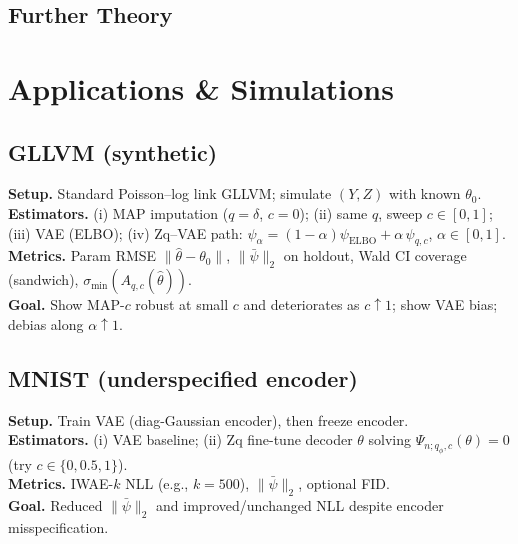 \documentclass[twoside,11pt]{article}
\begin{document}
\subsection{Further Theory}



\section{Applications \& Simulations}\label{sec:apps}

\subsection{GLLVM (synthetic)}
\textbf{Setup.} Standard Poisson–log link GLLVM; simulate $(Y,Z)$ with known $\theta_0$. \\
\textbf{Estimators.} (i) MAP imputation ($q=\delta$, $c=0$); (ii) same $q$, sweep $c\in[0,1]$; (iii) VAE (ELBO); (iv) Zq–VAE path: $\psi_\alpha=(1-\alpha)\psi_{\text{ELBO}}+\alpha\,\psi_{q,c}$, $\alpha\in[0,1]$. \\
\textbf{Metrics.} Param RMSE $\|\hat\theta-\theta_0\|$, $\|\bar\psi\|_2$ on holdout, Wald CI coverage (sandwich), $\sigma_{\min}(A_{q,c}(\hat\theta))$. \\
\textbf{Goal.} Show MAP-$c$ robust at small $c$ and deteriorates as $c\!\uparrow\!1$; show VAE bias; debias along $\alpha\uparrow1$.

\subsection{MNIST (underspecified encoder)}
\textbf{Setup.} Train VAE (diag-Gaussian encoder), then freeze encoder. \\
\textbf{Estimators.} (i) VAE baseline; (ii) Zq fine-tune decoder $\theta$ solving $\Psi_{n;q_\phi,c}(\theta)=0$ (try $c\in\{0,0.5,1\}$). \\
\textbf{Metrics.} IWAE-$k$ NLL (e.g., $k{=}500$), $\|\bar\psi\|_2$, optional FID. \\
\textbf{Goal.} Reduced $\|\bar\psi\|_2$ and improved/unchanged NLL despite encoder misspecification.
\end{document}
